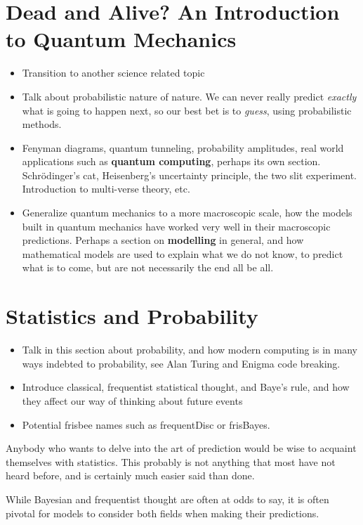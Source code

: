 \documentclass[12pt,twoside]{book}
\newcommand{\imp}[1]{\textbf{#1}}
\begin{document}
	\chapter[Quantum Mechanics]{Dead and Alive? An Introduction to Quantum Mechanics}
	\begin{itemize}
		\item Transition to another science related topic
		\item Talk about probabilistic nature of nature.  We can never really predict \emph{exactly} what is going to happen next, so our best bet is to \emph{guess}, using probabilistic methods.  
		\item Fenyman diagrams, quantum tunneling, probability amplitudes, real world applications such as \imp{quantum computing}, perhaps its own section.  Schr{\"o}dinger's cat, Heisenberg's uncertainty principle, the two slit experiment.  Introduction to multi-verse theory, etc.
		\item Generalize quantum mechanics to a more macroscopic scale, how the models built in quantum mechanics have worked very well in their macroscopic predictions.  Perhaps a section on \imp{modelling} in general, and how mathematical models are used to explain what we do not know, to predict what is to come, but are not necessarily the end all be all.  
	\end{itemize}
	\chapter{Statistics and Probability}
	\begin{itemize}
		\item Talk in this section about probability, and how modern computing is in many ways indebted to probability, see Alan Turing and Enigma code breaking.  
		\item Introduce classical, frequentist statistical thought, and Baye's rule, and how they affect our way of thinking about future events
		\item Potential frisbee names such as frequentDisc or frisBayes.
	\end{itemize}
	Anybody who wants to delve into the art of prediction would be wise to acquaint themselves with statistics.  This probably is not anything that most have not heard before, and is certainly much easier said than done.  
	
	While Bayesian and frequentist thought are often at odds to say, it is often pivotal for models to consider both fields when making their predictions.
\end{document}
